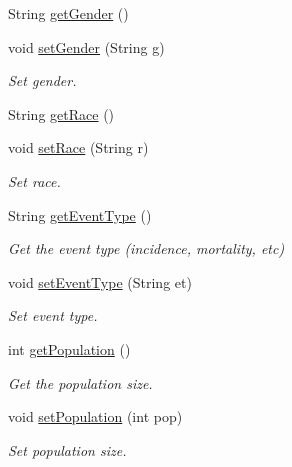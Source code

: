 \begin{DoxyCompactItemize}
String \hyperlink{classbridges_1_1data__src__dependent_1_1_cancer_incidence_a2c3cbe65d89827c167f15314b8b088b3}{get\+Gender} ()
\item 
void \hyperlink{classbridges_1_1data__src__dependent_1_1_cancer_incidence_a217681578e13197e1d177932c73ea80f}{set\+Gender} (String g)
\begin{DoxyCompactList}\small\item\em Set gender. \end{DoxyCompactList}\item 
String \hyperlink{classbridges_1_1data__src__dependent_1_1_cancer_incidence_a18de1c14d36cd7656555c8465ea8a009}{get\+Race} ()
\item 
void \hyperlink{classbridges_1_1data__src__dependent_1_1_cancer_incidence_a8c26c4358561453f3d2ca3a463eed872}{set\+Race} (String r)
\begin{DoxyCompactList}\small\item\em Set race. \end{DoxyCompactList}\item 
String \hyperlink{classbridges_1_1data__src__dependent_1_1_cancer_incidence_a844c6c3317bdb6b124f32b40804e1ff7}{get\+Event\+Type} ()
\begin{DoxyCompactList}\small\item\em Get the event type (incidence, mortality, etc) \end{DoxyCompactList}\item 
void \hyperlink{classbridges_1_1data__src__dependent_1_1_cancer_incidence_a39338b20223e60b79fa38b3034ca46b7}{set\+Event\+Type} (String et)
\begin{DoxyCompactList}\small\item\em Set event type. \end{DoxyCompactList}\item 
int \hyperlink{classbridges_1_1data__src__dependent_1_1_cancer_incidence_a41c2507d46589080f6bb76ab29f53665}{get\+Population} ()
\begin{DoxyCompactList}\small\item\em Get the population size. \end{DoxyCompactList}\item 
void \hyperlink{classbridges_1_1data__src__dependent_1_1_cancer_incidence_a9f1caf002b6573aa699a81ed1b835af0}{set\+Population} (int pop)
\begin{DoxyCompactList}\small\item\em Set population size. \end{DoxyCompactList}\item 

\end{DoxyCompactItemize}
